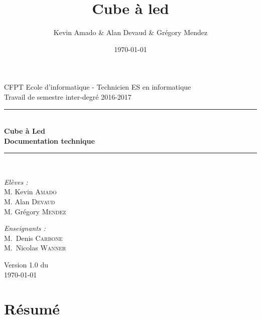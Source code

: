 \documentclass[a4paper,12pt]{article}
\title{Cube à led}
\author{Kevin Amado \& Alan Devaud \& Grégory Mendez}
\date{\today}
\begin{document}
	
\newcommand{\clcl}{\emph{CubeLedCommunicationLibrary} }

\begin{titlepage}
    \begin{center}
        {\large CFPT Ecole d'informatique - Technicien ES en informatique}\\[0.5cm]
        {\large Travail de semestre inter-degré 2016-2017}\\[0.5cm]
        
        \rule{\linewidth}{0.5mm} \\[0.4cm]
        { \huge \bfseries Cube à Led \\ Documentation technique\\[0.4cm] }
        \rule{\linewidth}{0.5mm} \\[1.5cm]
    
        \noindent
        \begin{minipage}{0.4\textwidth}
          \begin{flushleft} \large
            \emph{Elèves :}\\
            M. Kevin \textsc{Amado} \\
            M. Alan \textsc{Devaud}\\
            M. Grégory \textsc{Mendez}
          \end{flushleft}
        \end{minipage}%
        \begin{minipage}{0.4\textwidth}
          \begin{flushright} \large
            \emph{Enseignants :} \\
            M.~Denis \textsc{Carbone}\\
            M.~Nicolas \textsc{Wanner}
          \end{flushright}
        \end{minipage}
        
        \vfill

        {\large Version 1.0 du\\ \today}
    \end{center}
\end{titlepage}

\newpage

\section{Résumé}
\newpage
\end{document}
